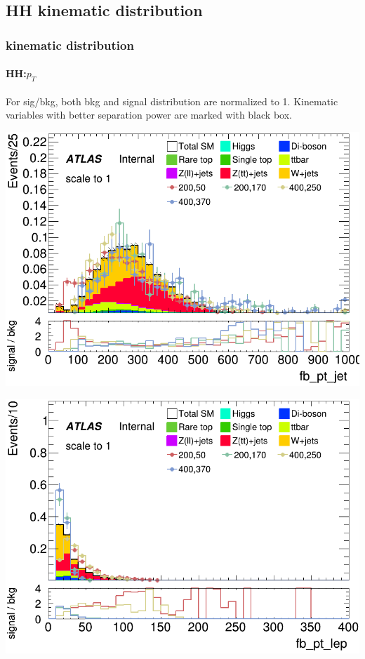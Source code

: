 \documentclass[usenames,dvipsnames]{beamer}
\begin{document}
\subsection{HH kinematic distribution}
\begin{frame}
	\frametitle{kinematic distribution}
	\framesubtitle{HH:$p_T$}
For sig/bkg, both bkg and signal distribution are normalized to 1. Kinematic variables with better separation power are marked with black box.

    \begin{minipage}{0.32\textwidth}
        \centering
        \includegraphics[width=\textwidth]{graphics/HH_met_sig/HH_fb_pt_jet_norm.png}
    \end{minipage}
    \hfill
    \begin{minipage}{0.32\textwidth}
        \centering
        \includegraphics[width=\textwidth]{graphics/HH_met_sig/HH_fb_pt_lep_norm.png}

\end{minipage}
\end{frame}
\end{document}
